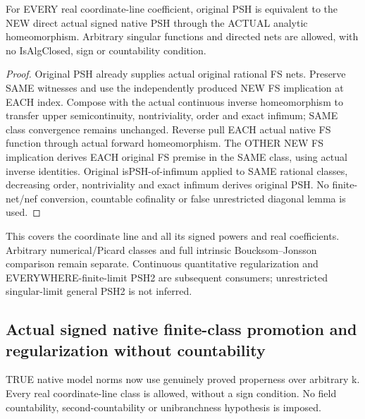 \begin{theorem}
\label{thm:seven-native-original-signed-psh-class-arbitrary-field}
\leanok
For EVERY real coordinate-line coefficient, original PSH is equivalent
to the NEW direct actual signed native PSH through the ACTUAL analytic
homeomorphism. Arbitrary singular functions and directed nets are allowed,
with no IsAlgClosed, sign or countability condition.
\end{theorem}
\begin{proof}
Original PSH already supplies actual original rational FS nets. Preserve
SAME witnesses and use the independently produced NEW FS implication
at EACH index. Compose with the actual continuous inverse homeomorphism
to transfer upper semicontinuity, nontriviality, order and exact infimum;
SAME class convergence remains unchanged. Reverse pull EACH actual
native FS function through actual forward homeomorphism. The OTHER
NEW FS implication derives EACH original FS premise in the SAME class,
using actual inverse identities. Original isPSH-of-infimum applied to
SAME rational classes, decreasing order, nontriviality and exact
infimum derives original PSH. No finite-net/nef conversion, countable
cofinality or false unrestricted diagonal lemma is used.
\end{proof}

This covers the coordinate line and all its signed powers and real
coefficients. Arbitrary numerical/Picard classes and full intrinsic
Boucksom--Jonsson comparison remain separate. Continuous quantitative
regularization and EVERYWHERE-finite-limit PSH2 are subsequent consumers;
unrestricted singular-limit general PSH2 is not inferred.

\subsection{Actual signed native finite-class promotion and regularization without countability}
TRUE native model norms now use genuinely proved properness over arbitrary k. Every real
coordinate-line class is allowed, without a sign condition. No field
countability, second-countability or unibranchness hypothesis is imposed.

